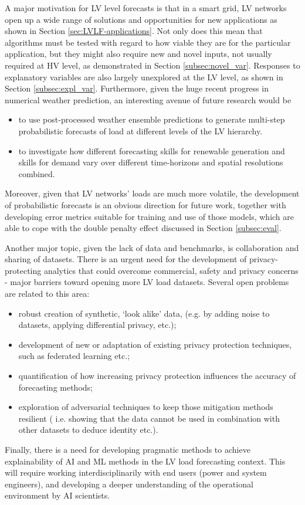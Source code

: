 A major motivation for LV level forecasts is that in a smart grid, LV networks open up a wide range of
solutions and opportunities for new applications as shown in Section \ref{sec:LVLF-applications}. Not only
does this mean that algorithms must be tested with regard to how viable they are for the
particular application, but they might also require new and novel inputs, not usually required at
HV level, as demonstrated in Section \ref{subsec:novel_var}. Responses to explanatory variables are also largely unexplored at the LV level, as shown in Section \ref{subsec:expl_var}. 
Furthermore, given the huge recent progress in numerical weather prediction, an interesting avenue of future research would be
\begin{itemize}
	\item to use post-processed weather ensemble predictions to generate multi-step probabilistic forecasts of load at different levels of the LV hierarchy. 
	\item to investigate how different forecasting skills for renewable generation and skills for demand vary over different time-horizons and spatial resolutions combined.
\end{itemize}

Moreover, given that LV networks' loads are much more volatile, the development of probabilistic forecasts is an obvious direction for future work, together with developing error metrics suitable for training and use of those models, which are able to cope with the double penalty effect discussed in Section \ref{subsec:eval}. 

Another major topic, given the lack of data and benchmarks, is collaboration and sharing of datasets. There is an urgent need for the development of privacy-protecting analytics that could overcome commercial, safety and privacy concerns -  major barriers toward opening more LV load datasets.
Several open problems are related to this area: 
\begin{itemize}
	\item robust creation of synthetic, `look alike' data,  (e.g. by adding noise to datasets,  applying differential privacy, etc.);
	\item development of new or adaptation of existing  privacy protection techniques, such as federated learning etc.;
	\item quantification of how increasing privacy protection influences the accuracy of forecasting methods;
	\item exploration of adversarial techniques to keep those mitigation methods resilient ( i.e. showing that the data cannot be used in combination with other datasets to deduce identity etc.).
\end{itemize}
Finally, there is a need for developing pragmatic methods to achieve explainability of AI and ML methods in the LV load forecasting context. This will require  working interdisciplinarily with end users (power and system engineers), and developing a deeper understanding of the operational environment by AI scientists.
